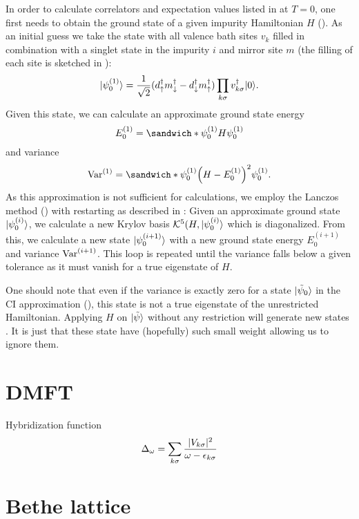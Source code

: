 In order to calculate correlators and expectation values listed in
 at $T=0$,
one first needs to obtain the ground state of a given impurity Hamiltonian $H$
().
As an initial guess we take the state with all valence bath sites $v_k$ filled in combination with
a singlet state in the impurity $i$ and mirror site $m$
(the filling of each site is sketched in ):
\begin{equation}
    \lvert\psi_0^{(1)}\rangle
    =
    \frac{1}{\sqrt{2}}
    (d^\dag_\uparrow m^\dag_\downarrow - d^\dag_\downarrow m^\dag_\uparrow)
    \prod_{k\sigma} v^\dag_{k\sigma}
    \lvert0\rangle.
\end{equation}
Given this state, we can calculate an approximate ground state energy
\begin{equation}
    E_0^{(1)} = \sandwich*{\psi_0^{(1)}}{H}{\psi_0^{(1)}}
\end{equation}
and variance
\begin{equation}
    \var^{(1)}
    =
    \sandwich*{\psi_0^{(1)}}{\left(H - E_0^{(1)}\right)^2}{\psi_0^{(1)}}.
\end{equation}
As this approximation is not sufficient for calculations,
we employ the Lanczos method () with restarting
as described in \cite{Lu2014}:
Given an approximate ground state $\lvert\psi_0^{(i)}\rangle$,
we calculate a new Krylov basis $\mathcal{K}^5(H, \lvert\psi_0^{(i)}\rangle$ which is diagonalized.
From this, we calculate a new state $\lvert\psi_0^{(i+1)}\rangle$
with a new ground state energy $E_0^{(i+1)}$
and variance $\operatorname{Var}^{(i+1)}$.
This loop is repeated until the variance falls below a given tolerance
as it must vanish for a true eigenstate of $H$.

One should note that even if the variance is exactly zero for a state $\lvert\tilde\psi_0\rangle$
in the CI approximation (),
this state is not a true eigenstate of the unrestricted Hamiltonian.
Applying $H$ on $\lvert\tilde\psi\rangle$ without any restriction
will generate new states \cite{Lu2014}.
It is just that these state have (hopefully) such small weight allowing us to ignore them.

\section{DMFT}

Hybridization function
\begin{align}
    \Delta_\omega = \sum_{k\sigma} \frac{\lvert V_{k\sigma}\rvert^2}{\omega - \epsilon_{k\sigma}}
\end{align}

\section{Bethe lattice}
